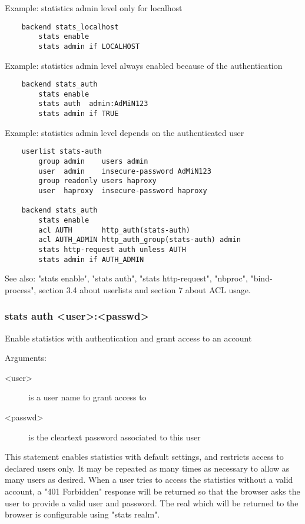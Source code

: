   Example: statistics admin level only for localhost
  \begin{verbatim}
    backend stats_localhost
        stats enable
        stats admin if LOCALHOST
  \end{verbatim}

  Example: statistics admin level always enabled because of the authentication
  \begin{verbatim}
    backend stats_auth
        stats enable
        stats auth  admin:AdMiN123
        stats admin if TRUE
  \end{verbatim}

  Example: statistics admin level depends on the authenticated user
  \begin{verbatim}
    userlist stats-auth
        group admin    users admin
        user  admin    insecure-password AdMiN123
        group readonly users haproxy
        user  haproxy  insecure-password haproxy

    backend stats_auth
        stats enable
        acl AUTH       http_auth(stats-auth)
        acl AUTH_ADMIN http_auth_group(stats-auth) admin
        stats http-request auth unless AUTH
        stats admin if AUTH_ADMIN
  \end{verbatim}

  See also: "stats enable", "stats auth", "stats http-request", "nbproc",
             "bind-process", section 3.4 about userlists and section 7 about
             ACL usage.

\subsubsection[stats auth]{stats auth <user>:<passwd>}


  Enable statistics with authentication and grant access to an account


  Arguments:
  \begin{description}
  \item[<user>] is a user name to grant access to
  \item[<passwd>] is the cleartext password associated to this user
  \end{description}

  This statement enables statistics with default settings, and restricts access
  to declared users only. It may be repeated as many times as necessary to
  allow as many users as desired. When a user tries to access the statistics
  without a valid account, a "401 Forbidden" response will be returned so that
  the browser asks the user to provide a valid user and password. The real
  which will be returned to the browser is configurable using "stats realm".

